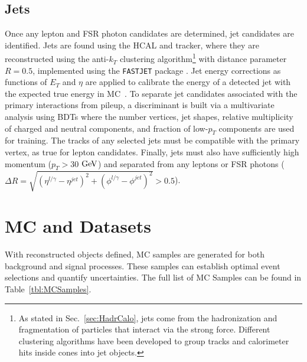 \subsection{Jets}
\label{sec:zz4lJets}

Once any lepton and FSR photon candidates are determined, jet candidates are identified. Jets are found using the HCAL and tracker, where they are reconstructed using the anti-$k_T$ clustering algorithm\footnote{As stated in Sec.~\ref{sec:HadrCalo}, jets come from the hadronization and fragmentation of particles that interact via the strong force. Different clustering algorithms have been developed to group tracks and calorimeter hits inside cones into jet objects.} \cite{antikt} with distance parameter $R=0.5$, implemented using the {\tt FASTJET} package \cite{Cacciari:2011ma}. Jet energy corrections as functions of $E_T$ and $\eta$ are applied to calibrate the energy of a detected jet with the expected true energy in MC~\cite{cmsJEC}. To separate jet candidates associated with the primary interactions from pileup, a discriminant is built \cite{CMS-PAS-JME-13-005} via a multivariate analysis using BDTs where the number vertices, jet shapes, relative multiplicity of charged and neutral components, and fraction of low-$p_T$ components are used for training. The tracks of any selected jets must be compatible with the primary vertex, as true for lepton candidates. Finally, jets must also have sufficiently high momentum ($p_T>30$ $\rm{GeV}$) and separated from any leptons or FSR photons ($\Delta R = \sqrt{(\eta^{l/\gamma}-\eta^{jet})^2 + (\phi^{l/\gamma}-\phi^{jet})^2} > 0.5$).

\section{MC and Datasets}
\label{sec:ZZ4lMCandData}

With reconstructed objects defined, MC samples are generated for both background and signal processes. These samples can establish optimal event selections and quantify uncertainties. The full list of MC Samples can be found in Table~\ref{tbl:MCSamples}. 

